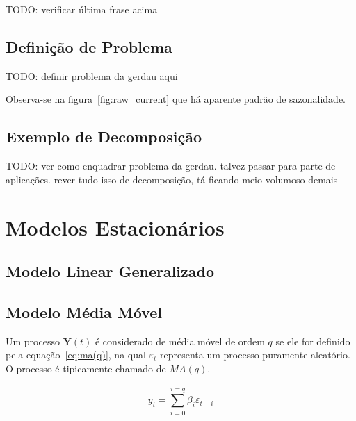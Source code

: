 TODO: verificar última frase acima

\subsection{Definição de Problema}

TODO: definir problema da gerdau aqui


Observa-se na figura~\ref{fig:raw_current} que há aparente padrão de
sazonalidade.

\subsection{Exemplo de Decomposição}

TODO: ver como enquadrar problema da gerdau. talvez passar para parte de
aplicações. rever tudo isso de decomposição, tá ficando meio volumoso demais





\section{Modelos Estacionários}

\subsection{Modelo Linear Generalizado}
\label{sec:glm}

\subsection{Modelo Média Móvel}
\label{ssec:MA(p)}

Um processo $\mathbf{Y}(t)$ é considerado de média móvel de ordem $q$ se ele
for definido pela equação~\ref{eq:ma(q)}, na qual $\varepsilon_t$ representa um
processo puramente aleatório. O processo é tipicamente chamado de $MA(q)$.

\begin{equation}\label{eq:ma(q)}
    y_t = \sum_{i=0}^{i=q} \beta_i \varepsilon_{t-i}
\end{equation}

